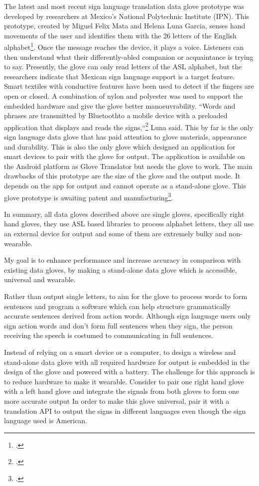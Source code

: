 The latest and most recent sign language translation data glove prototype was developed by researchers at Mexico's National Polytechnic Institute (IPN). This prototype, created by Miguel Felix Mata and Helena Luna Garcia, senses hand movements of the user and identifies them with the 26 letters of the English alphabet\footcite{MexicoPoly}. Once the message reaches the device, it plays a voice. Listeners can then understand what their differently-abled companion or acquaintance is trying to say. Presently, the glove can only read letters of the ASL alphabet, but the researchers indicate that Mexican sign language support is a target feature. Smart textiles with conductive features have been used to detect if the fingers are open or closed. A combination of nylon and polyester was used to support the embedded hardware and give the glove better manoeuvrability. ``Words and phrases are transmitted by Bluetooth\texttrademark to a mobile device with a preloaded application that displays and reads the signs,``\footcite{MexicoPoly} Luna said. This by far is the only sign language data glove that has paid attention to glove materials, appearance and durability. This is also the only glove which designed an application for smart devices to pair with the glove for output. The application is available on the Android platform as Glove Translator but needs the glove to work. The main drawbacks of this prototype are the size of the glove and the output mode. It depends on the app for output and cannot operate as a stand-alone glove. This glove prototype is awaiting patent and manufacturing\footcite{MexicoPoly}.

In summary, all data gloves described above are single gloves, specifically right hand gloves, they use ASL based libraries to process alphabet letters, they all use an external device for output and some of them are extremely bulky and non-wearable. 

My goal is to enhance performance and increase accuracy in comparison with existing data gloves, by making a stand-alone data glove which is accessible, universal and wearable. 

Rather than output single letters, to aim for the glove to process words to form sentences and program a software which can help structure grammatically accurate sentences derived from action words. Although sign language users only sign action words and don’t form full sentences when they sign, the person receiving the speech is costumed to communicating in full sentences. 

Instead of relying on a smart device or a computer, to design a wireless and stand-alone data glove with all required hardware for output is embedded in the design of the glove and powered with a battery. The challenge for this approach is to reduce hardware to make it wearable. 
Consider to pair one right hand glove with a left hand glove and integrate the signals from both gloves to form one more accurate output
In order to make this glove universal, pair it with a translation API to output the signs in different languages even though the sign language used is American.

